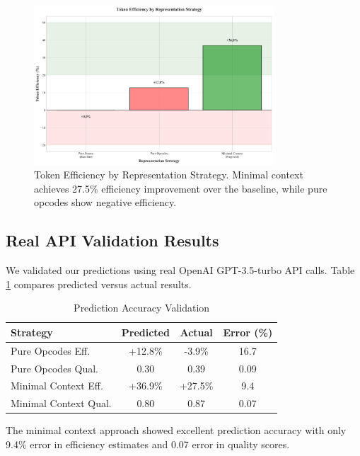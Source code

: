 \documentclass[conference]{IEEEtran}
\begin{document}
\begin{figure}[htbp]
\centerline{\includegraphics[width=0.8\textwidth]{hybrid_context_demo_efficiency.png}}
\caption{Token Efficiency by Representation Strategy. Minimal context achieves 27.5\% efficiency improvement over the baseline, while pure opcodes show negative efficiency.}
\label{fig:efficiency}
\end{figure}

\subsection{Real API Validation Results}

We validated our predictions using real OpenAI GPT-3.5-turbo API calls. Table \ref{tab:validation} compares predicted versus actual results.

\begin{table}[htbp]
\caption{Prediction Accuracy Validation}
\begin{center}
\begin{tabular}{|l|c|c|c|}
\hline
\textbf{Strategy} & \textbf{Predicted} & \textbf{Actual} & \textbf{Error (\%)} \\
\hline
Pure Opcodes Eff. & +12.8\% & -3.9\% & 16.7 \\
Pure Opcodes Qual. & 0.30 & 0.39 & 0.09 \\
Minimal Context Eff. & +36.9\% & +27.5\% & 9.4 \\
Minimal Context Qual. & 0.80 & 0.87 & 0.07 \\
\hline
\end{tabular}
\end{center}
\label{tab:validation}
\end{table}

The minimal context approach showed excellent prediction accuracy with only 9.4\% error in efficiency estimates and 0.07 error in quality scores.
\end{document}
